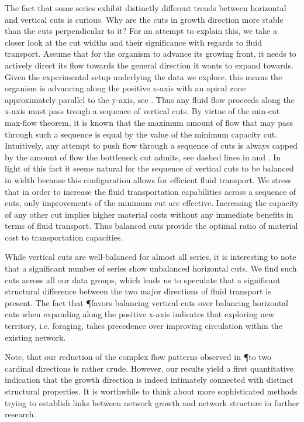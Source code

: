 		The fact that some series exhibit distinctly different trends between horizontal and vertical cuts is curious. Why are the cuts in growth direction more stable than the cuts perpendicular to it? For an attempt to explain this, we take a closer look at the cut widths and their significance with regards to fluid transport. Assume that for the organism to advance its growing front, it needs to actively direct its flow towards the general direction it wants to expand towards. Given the experimental setup underlying the data we explore, this means the organism is advancing along the positive x-axis with an apical zone approximately parallel to the y-axis, see . Thus any fluid flow proceeds along the x-axis must pass trough a sequence of vertical cuts. By virtue of the min-cut max-flow theorem, it is known that the maximum amount of flow that may pass through such a sequence is equal by the value of the minimum capacity cut. Intuitively, any attempt to push flow through a sequence of cuts is always capped by the amount of flow the bottleneck cut admits, see dashed lines in  and . In light of this fact it seems natural for the sequence of vertical cuts to be balanced in width because this configuration allows for efficient fluid transport. We stress that in order to increase the fluid transportation capabilities across a sequence of cuts, only improvements of the minimum cut are effective. Increasing the capacity of any other cut implies higher material costs without any immediate benefits in terms of fluid transport. Thus balanced cuts provide the optimal ratio of material cost to transportation capacities.

		While vertical cuts are well-balanced for almost all series, it is interesting to note that a significant number of series show unbalanced horizontal cuts. We find such cuts across all our data groups, which leads us to speculate that a significant structural difference between the two major directions of fluid transport is present. The fact that \P favors balancing vertical cuts over balancing horizontal cuts when expanding along the positive x-axis indicates that exploring new territory, i.e. foraging, takes precedence over improving circulation within the existing network.

		Note, that our reduction of the complex flow patterns observed in \P to two cardinal directions is rather crude. However, our results yield a first quantitative indication that the growth direction is indeed intimately connected with distinct structural properties. It is worthwhile to think about more sophisticated methods trying to establish links between network growth and network structure in further research.

